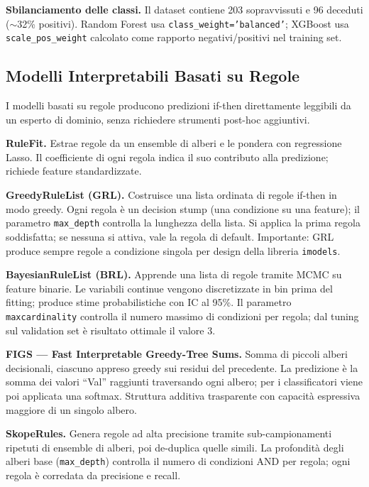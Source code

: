 \documentclass[a4paper,11pt]{article}
\begin{document}
\textbf{Sbilanciamento delle classi.}
Il dataset contiene 203 sopravvissuti e 96 deceduti ($\sim$32\% positivi).
Random Forest usa \texttt{class\_weight='balanced'}; XGBoost usa \texttt{scale\_pos\_weight}
calcolato come rapporto negativi/positivi nel training set.

\subsection{Modelli Interpretabili Basati su Regole}

I modelli basati su regole producono predizioni if-then direttamente leggibili da un esperto
di dominio, senza richiedere strumenti post-hoc aggiuntivi.

\textbf{RuleFit.}
Estrae regole da un ensemble di alberi e le pondera con regressione Lasso. Il coefficiente
di ogni regola indica il suo contributo alla predizione; richiede feature standardizzate.

\textbf{GreedyRuleList (GRL).}
Costruisce una lista ordinata di regole if-then in modo greedy. Ogni regola è un decision
stump (una condizione su una feature); il parametro \texttt{max\_depth} controlla la lunghezza
della lista. Si applica la prima regola soddisfatta; se nessuna si attiva, vale la regola di
default. Importante: GRL produce sempre regole a condizione singola per design
della libreria \texttt{imodels}.

\textbf{BayesianRuleList (BRL).}
Apprende una lista di regole tramite MCMC su feature binarie. Le variabili continue vengono
discretizzate in bin prima del fitting; produce stime probabilistiche con IC al 95\%.
Il parametro \texttt{maxcardinality} controlla il numero massimo di condizioni per regola;
dal tuning sul validation set è risultato ottimale il valore 3.

\textbf{FIGS --- Fast Interpretable Greedy-Tree Sums.}
Somma di piccoli alberi decisionali, ciascuno appreso greedy sui residui del precedente.
La predizione è la somma dei valori ``Val'' raggiunti traversando ogni albero; per i
classificatori viene poi applicata una softmax. Struttura additiva trasparente con capacità
espressiva maggiore di un singolo albero.

\textbf{SkopeRules.}
Genera regole ad alta precisione tramite sub-campionamenti ripetuti di ensemble di alberi,
poi de-duplica quelle simili. La profondità degli alberi base (\texttt{max\_depth}) controlla
il numero di condizioni AND per regola; ogni regola è corredata da precisione e recall.
\end{document}
